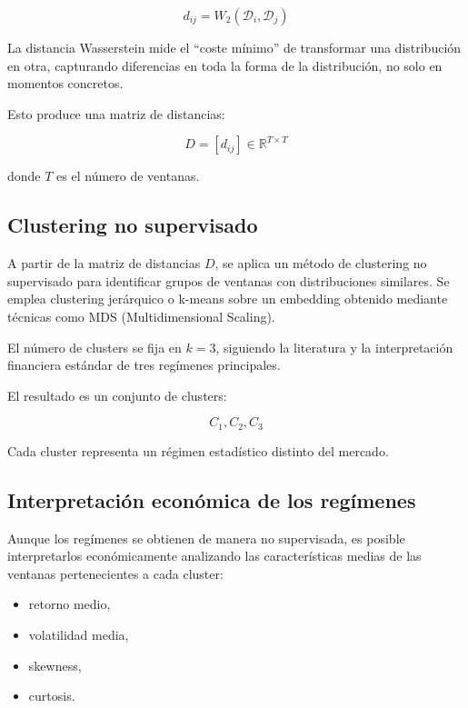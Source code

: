 \documentclass[12pt]{article}
\begin{document}
\[
d_{ij} = W_2(\mathcal{D}_i, \mathcal{D}_j)
\]



La distancia Wasserstein mide el “coste mínimo” de transformar una distribución en otra, capturando diferencias en toda la forma de la distribución, no solo en momentos concretos.

Esto produce una matriz de distancias:



\[
D = [d_{ij}] \in \mathbb{R}^{T \times T}
\]



donde $T$ es el número de ventanas.

\subsection{Clustering no supervisado}

A partir de la matriz de distancias $D$, se aplica un método de clustering no supervisado para identificar grupos de ventanas con distribuciones similares. Se emplea clustering jerárquico o k-means sobre un embedding obtenido mediante técnicas como MDS (Multidimensional Scaling).

El número de clusters se fija en $k = 3$, siguiendo la literatura y la interpretación financiera estándar de tres regímenes principales.

El resultado es un conjunto de clusters:



\[
C_1, C_2, C_3
\]



Cada cluster representa un régimen estadístico distinto del mercado.

\subsection{Interpretación económica de los regímenes}

Aunque los regímenes se obtienen de manera no supervisada, es posible interpretarlos económicamente analizando las características medias de las ventanas pertenecientes a cada cluster:

\begin{itemize}
    \item retorno medio,
    \item volatilidad media,
    \item skewness,
    \item curtosis.
\end{itemize}
\end{document}
